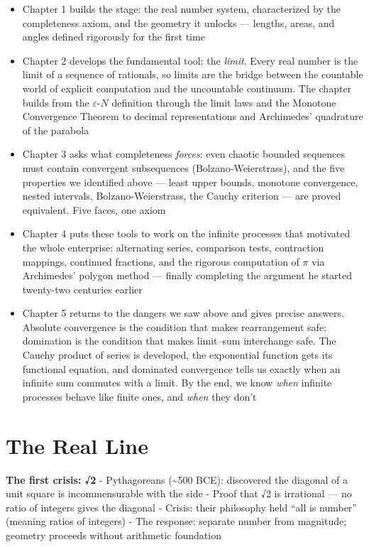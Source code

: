 \documentclass[
  10pt,
  letterpaper,
]{scrbook}
\providecommand{\tightlist}{%
  \setlength{\itemsep}{0pt}\setlength{\parskip}{0pt}}
\begin{document}
\begin{itemize}
\tightlist
\item
  Chapter 1 builds the stage: the real number system, characterized by
  the completeness axiom, and the geometry it unlocks --- lengths,
  areas, and angles defined rigorously for the first time
\item
  Chapter 2 develops the fundamental tool: the \emph{limit}. Every real
  number is the limit of a sequence of rationals, so limits are the
  bridge between the countable world of explicit computation and the
  uncountable continuum. The chapter builds from the
  \(\varepsilon\)-\(N\) definition through the limit laws and the
  Monotone Convergence Theorem to decimal representations and
  Archimedes' quadrature of the parabola
\item
  Chapter 3 asks what completeness \emph{forces}: even chaotic bounded
  sequences must contain convergent subsequences (Bolzano-Weierstrass),
  and the five properties we identified above --- least upper bounds,
  monotone convergence, nested intervals, Bolzano-Weierstrass, the
  Cauchy criterion --- are proved equivalent. Five faces, one axiom
\item
  Chapter 4 puts these tools to work on the infinite processes that
  motivated the whole enterprise: alternating series, comparison tests,
  contraction mappings, continued fractions, and the rigorous
  computation of \(\pi\) via Archimedes' polygon method --- finally
  completing the argument he started twenty-two centuries earlier
\item
  Chapter 5 returns to the dangers we saw above and gives precise
  answers. Absolute convergence is the condition that makes
  rearrangement safe; domination is the condition that makes limit--sum
  interchange safe. The Cauchy product of series is developed, the
  exponential function gets its functional equation, and dominated
  convergence tells us exactly when an infinite sum commutes with a
  limit. By the end, we know \emph{when} infinite processes behave like
  finite ones, and \emph{when} they don't
\end{itemize}

\chapter{The Real Line}\label{the-real-line}

\textbf{The first crisis: √2} - Pythagoreans (\textasciitilde500 BCE):
discovered the diagonal of a unit square is incommensurable with the
side - Proof that √2 is irrational --- no ratio of integers gives the
diagonal - Crisis: their philosophy held ``all is number'' (meaning
ratios of integers) - The response: separate number from magnitude;
geometry proceeds without arithmetic foundation
\end{document}
